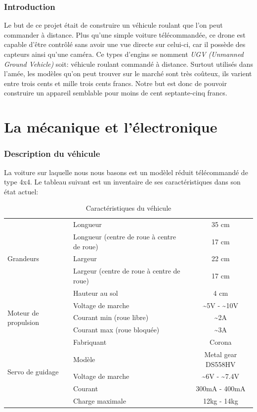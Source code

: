 \documentclass[a4paper,12pt]{article}
\begin{document}
{\section*{Introduction}
Le but de ce projet était de construire un véhicule roulant que l'on peut commander à distance. Plus qu'une simple voiture télécommandée, ce drone est capable d'être contrôlé sans avoir une vue directe sur celui-ci, car il possède des capteurs ainsi qu'une caméra. Ce types d'engins se nomment \textit{UGV (Unmanned Ground Vehicle)} soit: véhicule roulant commandé à distance. Surtout utilisés dans l'amée, les modèles qu'on peut trouver sur le marché sont très coûteux, ils varient entre trois cents et mille trois cents francs. Notre but est donc de pouvoir construire un appareil semblable pour moins de cent septante-cinq francs. 
\clearpage
\part{La mécanique et l'électronique}


\section{Description du véhicule \label{TableDesc}}
La voiture sur laquelle nous nous basons est un modèlel r\'eduit
t\'el\'ecommand\'e de type 4x4. Le tableau suivant est un inventaire de 
ses caractéristiques dans son \'etat actuel:
\begin{table}[h!]
\begin{center}
  \begin{tabular}{|p{4cm}|p{4cm}|c|}
    \hline
    \multirow{5}{*}{Grandeurs}
    &Longueur & 35 cm \\ \cline{2-3}
    &Longueur (centre de roue \`a centre de roue)& 17 cm \\ \cline{2-3}
    &Largeur & 22 cm \\ \cline{2-3}
    &Largeur (centre de roue \`a centre de roue) & 17 cm \\ \cline{2-3}
    & Hauteur au sol & 4 cm\\ \hline
    \multirow{3}{*}{Moteur de propulsion}
    & Voltage de marche & \~{}5V - \~{}10V  \\ \cline{2-3}
    & Courant min (roue libre) & \~{}2A \\ \cline{2-3}
    & Courant max (roue bloqu\'ee) & \~{}3A \\ \hline
    \multirow{5}{*}{Servo de guidage}
    & Fabriquant & Corona \\ \cline{2 - 3}
    & Modèle & Metal gear DS558HV\\ \cline{2-3}
    & Voltage de marche & \~{}6V - \~{}7.4V  \\ \cline{2-3}
    & Courant & 300mA - 400mA \\ \cline{2-3}
    & Charge maximale & 12kg - 14kg \\  
 \hline
	\end{tabular}
\end{center}
\caption{Caractéristiques du véhicule}
\end{table}
}
\end{document}
